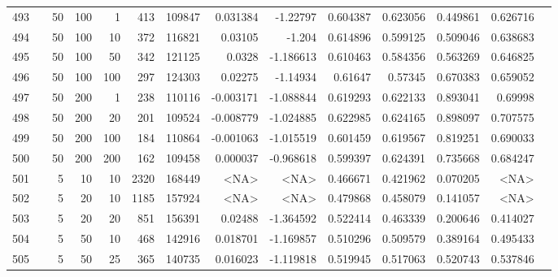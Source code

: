 \begin{longtable}{llrrrrrrrrrrrr}
		493 & &           50 &               100 &            1 &          413 &     109847 &  0.031384 &  -1.22797 &  0.604387 &    0.623056 &       0.449861 &  0.626716 \\
		494 & &           50 &               100 &           10 &          372 &     116821 &   0.03105 &    -1.204 &  0.614896 &    0.599125 &       0.509046 &  0.638683 \\
		495 & &           50 &               100 &           50 &          342 &     121125 &    0.0328 & -1.186613 &  0.610463 &    0.584356 &       0.563269 &  0.646825 \\
		496 & &           50 &               100 &          100 &          297 &     124303 &   0.02275 &  -1.14934 &   0.61647 &     0.57345 &       0.670383 &  0.659052 \\
		497 & &           50 &               200 &            1 &          238 &     110116 & -0.003171 & -1.088844 &  0.619293 &    0.622133 &       0.893041 &   0.69998 \\
		498 & &           50 &               200 &           20 &          201 &     109524 & -0.008779 & -1.024885 &  0.622985 &    0.624165 &       0.898097 &  0.707575 \\
		499 & &           50 &               200 &          100 &          184 &     110864 & -0.001063 & -1.015519 &  0.601459 &    0.619567 &       0.819251 &  0.690033 \\
		500 & &           50 &               200 &          200 &          162 &     109458 &  0.000037 & -0.968618 &  0.599397 &    0.624391 &       0.735668 &  0.684247 \\\midrule
		501 & \multirow[t]{74}{*}{\rotatebox[origin=r]{90}{use-default}} &            5 &                10 &           10 &        2320 &     168449 &      <NA> &      <NA> &  0.466671 &    0.421962 &       0.070205 &  <NA> \\
		502 & &            5 &                20 &           10 &           1185 &     157924 &      <NA> &      <NA> &  0.479868 &    0.458079 &       0.141057 &  <NA> \\
		503 & &            5 &                20 &           20 &         851 &     156391 &   0.02488 & -1.364592 &  0.522414 &    0.463339 &       0.200646 &  0.414027 \\
		504 & &            5 &                50 &           10 &         468 &     142916 &  0.018701 & -1.169857 &  0.510296 &    0.509579 &       0.389164 &  0.495433 \\
		505 & &            5 &                50 &           25 &         365 &     140735 &  0.016023 & -1.119818 &  0.519945 &    0.517063 &       0.520743 &  0.537846 \\

\end{longtable}
